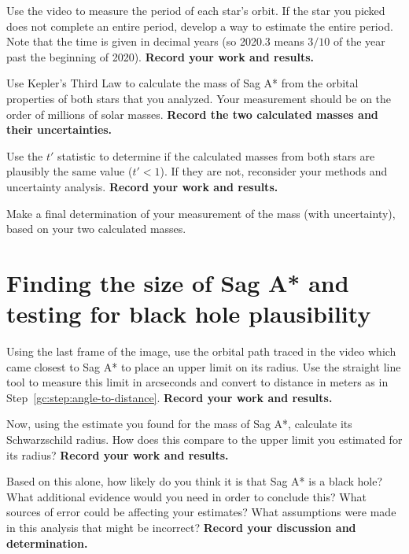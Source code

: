 \begin{steps}
	\item Use the video to measure the period of each star's orbit. If the star you picked does not complete an entire period, develop a way to estimate the entire period. Note that the time is given in decimal years (so 2020.3 means $3/10$ of the year past the beginning of 2020). \textbf{Record your work and results.}

	\item Use Kepler's Third Law to calculate the mass of Sag A* from the orbital properties of both stars that you analyzed. Your measurement should be on the order of millions of solar masses. \textbf{Record the two calculated masses and their uncertainties.}
	
	\item Use the $t'$ statistic to determine if the calculated masses from both stars are plausibly the same value ($t' < 1$). If they are not, reconsider your methods and uncertainty analysis. \textbf{Record your work and results.}
	
	\item Make a final determination of your measurement of the mass (with uncertainty), based on your two calculated masses.

\section{Finding the size of Sag A* and testing for black hole plausibility}

	\item Using the last frame of the image, use the orbital path traced in the video which came closest to Sag A* to place an upper limit on its radius. Use the straight line tool to measure this limit in arcseconds and convert to distance in meters as in Step\ \ref{gc:step:angle-to-distance}. \textbf{Record your work and results.}

	\item Now, using the estimate you found for the mass of Sag A*, calculate its Schwarzschild radius. How does this compare to the upper limit you estimated for its radius? \textbf{Record your work and results.}
	
	\item Based on this alone, how likely do you think it is that Sag A* is a black hole? What additional evidence would you need in order to conclude this? What sources of error could be affecting your estimates? What assumptions were made in this analysis that might be incorrect? \textbf{Record your discussion and determination.}
	

\end{steps}
